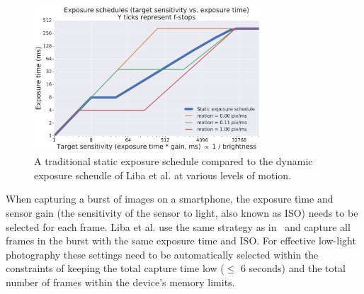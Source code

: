 \documentclass{sig-alternate}
\begin{document}
\begin{figure}
\centering
\includegraphics[width=20pc]{figures/liba2019-figure-7.pdf}
\caption{A traditional static exposure schedule compared to the dynamic exposure scheudle of Liba et al. at various levels of motion.~\cite{Liba2019}}
\label{fig:exposure}


\end{figure}

When capturing a burst of images on a smartphone, the exposure time and sensor gain (the sensitivity of the sensor to light, also known as ISO) needs to be selected for each frame. Liba et al. use the same strategy as in~\cite{Hasinoff2016} and capture all frames in the burst with the same exposure time and ISO. For effective low-light photography these settings need to be automatically selected within the constraints of keeping the total capture time low ($\leq$ 6 seconds) and the total number of frames within the device's memory limits.
\end{document}
